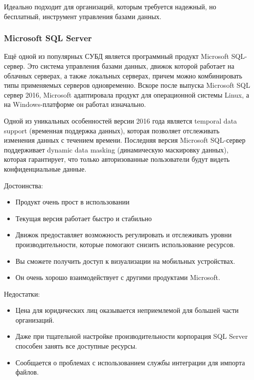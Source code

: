Идеально подходит для организаций, которым требуется надежный, но бесплатный, инструмент управления базами данных.

\subsubsection{Microsoft SQL Server}

Ещё одной из популярных СУБД является программный продукт Microsoft SQL-сервер. Это система управления базами данных, движок которой работает на облачных серверах, а также локальных серверах, причем можно комбинировать типы применяемых серверов одновременно. Вскоре после выпуска Microsoft SQL сервер 2016, Microsoft адаптировала продукт для операционной системы Linux, а на Windows-платформе он работал изначально.

Одной из уникальных особенностей версии 2016 года является temporal data support (временная поддержка данных), которая позволяет отслеживать изменения данных с течением времени. Последняя версия Microsoft SQL-сервер поддерживает dynamic data masking (динамическую маскировку данных), которая гарантирует, что только авторизованные пользователи будут видеть конфиденциальные данные.

Достоинства:

\begin{itemize}
\item Продукт очень прост в использовании
\item Текущая версия работает быстро и стабильно
\item Движок предоставляет возможность регулировать и отслеживать уровни производительности, которые помогают снизить использование ресурсов.
\item Вы сможете получить доступ к визуализации на мобильных устройствах.
\item Он очень хорошо взаимодействует с другими продуктами Microsoft.
\end{itemize}

Недостатки:

\begin{itemize}
\item Цена для юридических лиц оказывается неприемлемой для большей части организаций.
\item Даже при тщательной настройке производительности корпорация SQL Server способен занять все доступные ресурсы.
\item Сообщается о проблемах с использованием службы интеграции для импорта файлов.
\end{itemize}

